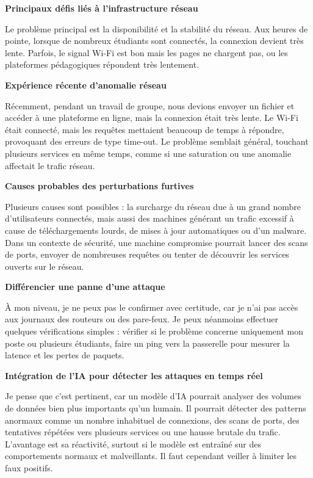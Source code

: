 \documentclass[12pt,a4paper]{report}
\begin{document}
\bigskip
\textbf{Principaux défis liés à l'infrastructure réseau}

Le probl\`{e}me principal est la disponibilit\'{e} et la stabilit\'{e} du r\'{e}seau. Aux heures de pointe, lorsque de nombreux \'{e}tudiants sont connect\'{e}s, la connexion devient tr\`{e}s lente. Parfois, le signal Wi-Fi est bon mais les pages ne chargent pas, ou les plateformes p\'{e}dagogiques r\'{e}pondent tr\`{e}s lentement.

\bigskip
\textbf{Expérience récente d'anomalie réseau}

R\'{e}cemment, pendant un travail de groupe, nous devions envoyer un fichier et acc\'{e}der \`{a} une plateforme en ligne, mais la connexion \'{e}tait tr\`{e}s lente. Le Wi-Fi \'{e}tait connect\'{e}, mais les requ\^{e}tes mettaient beaucoup de temps \`{a} r\'{e}pondre, provoquant des erreurs de type time-out. Le probl\`{e}me semblait g\'{e}n\'{e}ral, touchant plusieurs services en m\^{e}me temps, comme si une saturation ou une anomalie affectait le trafic r\'{e}seau.

\bigskip
\textbf{Causes probables des perturbations furtives}

Plusieurs causes sont possibles : la surcharge du r\'{e}seau due \`{a} un grand nombre d'utilisateurs connect\'{e}s, mais aussi des machines g\'{e}n\'{e}rant un trafic excessif \`{a} cause de t\'{e}l\'{e}chargements lourds, de mises \`{a} jour automatiques ou d'un malware. Dans un contexte de s\'{e}curit\'{e}, une machine compromise pourrait lancer des scans de ports, envoyer de nombreuses requ\^{e}tes ou tenter de d\'{e}couvrir les services ouverts sur le r\'{e}seau.

\bigskip
\textbf{Différencier une panne d'une attaque}

\`{A} mon niveau, je ne peux pas le confirmer avec certitude, car je n'ai pas acc\`{e}s aux journaux des routeurs ou des pare-feux. Je peux n\'{e}anmoins effectuer quelques v\'{e}rifications simples : v\'{e}rifier si le probl\`{e}me concerne uniquement mon poste ou plusieurs \'{e}tudiants, faire un ping vers la passerelle pour mesurer la latence et les pertes de paquets.

\bigskip
\textbf{Intégration de l'IA pour détecter les attaques en temps réel}

Je pense que c'est pertinent, car un mod\`{e}le d'IA pourrait analyser des volumes de donn\'{e}es bien plus importants qu'un humain. Il pourrait d\'{e}tecter des patterns anormaux comme un nombre inhabituel de connexions, des scans de ports, des tentatives r\'{e}p\'{e}t\'{e}es vers plusieurs services ou une hausse brutale du trafic. L'avantage est sa r\'{e}activit\'{e}, surtout si le mod\`{e}le est entra\^{i}n\'{e} sur des comportements normaux et malveillants. Il faut cependant veiller \`{a} limiter les faux positifs.
\end{document}
